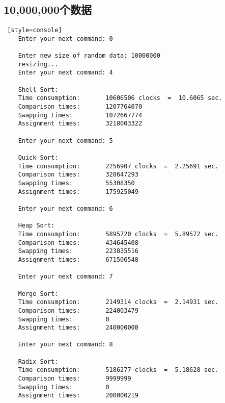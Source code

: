 \subsection{10,000,000个数据}
\begin{lstlisting} [style=console]
    Enter your next command: 0

    Enter new size of random data: 10000000
    resizing...
    Enter your next command: 4
    
    Shell Sort:
    Time consumption:		10606506 clocks  =  10.6065 sec.
    Comparison times:		1207764070
    Swapping times:  		1072667774
    Assignment times:		3218003322
    
    Enter your next command: 5
    
    Quick Sort:
    Time consumption:		2256907 clocks  =  2.25691 sec.
    Comparison times:		320647293
    Swapping times:  		55308350
    Assignment times:		175925049
    
    Enter your next command: 6
    
    Heap Sort:
    Time consumption:		5895720 clocks  =  5.89572 sec.
    Comparison times:		434645408
    Swapping times:  		223835516
    Assignment times:		671506548
    
    Enter your next command: 7
    
    Merge Sort:
    Time consumption:		2149314 clocks  =  2.14931 sec.
    Comparison times:		224003479
    Swapping times:  		0
    Assignment times:		240000000
    
    Enter your next command: 8
    
    Radix Sort:
    Time consumption:		5186277 clocks  =  5.18628 sec.
    Comparison times:		9999999
    Swapping times:  		0
    Assignment times:		200000219
\end{lstlisting}


